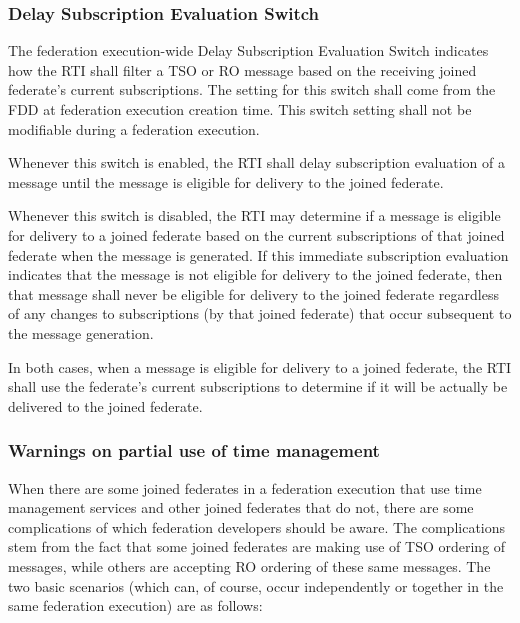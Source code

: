 \clearpage

\begin{compactstdpage}

    \subsubsection{Delay Subscription Evaluation Switch}

    The federation execution-wide Delay Subscription Evaluation Switch indicates how the RTI shall filter a TSO or RO message based on the receiving joined federate's current subscriptions. The setting for this switch shall come from the FDD at federation execution creation time. This switch setting shall not be modifiable during a federation execution.

    Whenever this switch is enabled, the RTI shall delay subscription evaluation of a message until the message is eligible for delivery to the joined federate.

    Whenever this switch is disabled, the RTI may determine if a message is eligible for delivery to a joined federate based on the current subscriptions of that joined federate when the message is generated. If this immediate subscription evaluation indicates that the message is not eligible for delivery to the joined federate, then that message shall never be eligible for delivery to the joined federate regardless of any changes to subscriptions (by that joined federate) that occur subsequent to the message generation.

    In both cases, when a message is eligible for delivery to a joined federate, the RTI shall use the federate's current subscriptions to determine if it will be actually be delivered to the joined federate.

    \subsubsection{Warnings on partial use of time management}

    When there are some joined federates in a federation execution that use time management services and other joined federates that do not, there are some complications of which federation developers should be aware. The complications stem from the fact that some joined federates are making use of TSO ordering of messages, while others are accepting RO ordering of these same messages. The two basic scenarios (which can, of course, occur independently or together in the same federation execution) are as follows:


\end{compactstdpage}
